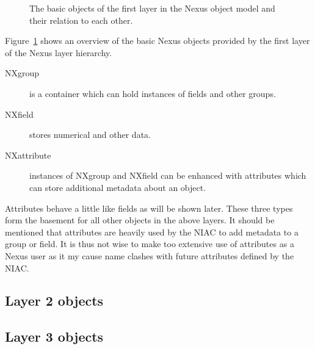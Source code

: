 \begin{figure}[tb]
    \centering
    \begin{minipage}[c]{0.6\linewidth}
    \centering
    \end{minipage}
    \hfill
    \begin{minipage}[c]{0.39\linewidth}
    \caption{{\small The basic objects of the first layer in the Nexus object
    model and their relation to each other.}}
    \label{fig:nxintro:layer1}
    \end{minipage}
\end{figure}

Figure~\ref{fig:nxintro:layer1} shows an overview of the basic Nexus objects
provided by the first layer of the Nexus layer hierarchy. 
\begin{description}
    \item[NXgroup] is a container which can hold instances of fields and other
        groups.
    \item[NXfield] stores numerical and other data.
    \item[NXattribute] instances of NXgroup and NXfield can be enhanced with
        attributes which can store additional metadata about an object.
\end{description}
Attributes behave a little like fields as will be shown later. These three types
form the basement for all other objects in the above layers. 
It should be mentioned that attributes are heavily used by the NIAC to add
metadata to a group or field. It is thus not wise to make too extensive use of
attributes as a Nexus user as it my cause name clashes with future attributes
defined by the NIAC.

\subsection{Layer 2 objects}

\subsection{Layer 3 objects}
